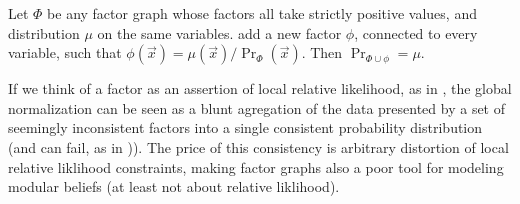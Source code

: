 \documentclass{article}
\theoremstyle{plain}
\theoremstyle{definition}
\newenvironment{example}
	{\pushQED{\qed}\renewcommand{\qedsymbol}{$\triangle$}\examplex}
	{\popQED\endexamplex%
}
\theoremstyle{remark}
\numberwithin{equation}{section}
\begin{document}
	\begin{example}\label{ex:fg-volatile-2}
		Let $\Phi$ be any factor graph whose factors all take strictly positive values, and distribution $\mu$ on the same variables. add a new factor $\phi$, connected to every variable, such that $\phi(\vec x) = {\mu(\vec x)}/{\Pr_\Phi(\vec x)}$. Then $\Pr_{\Phi \cup \phi} = \mu$. 
	\end{example}

	If we think of a factor as an assertion of local relative likelihood, as in , the global normalization can be seen as a blunt agregation of the data presented by a set of seemingly inconsistent factors into a single consistent probability distribution (and can fail, as in )). The price of this consistency is arbitrary distortion of local relative liklihood constraints, making factor graphs also a poor tool for modeling modular beliefs (at least not about relative liklihood). 
\end{document}

